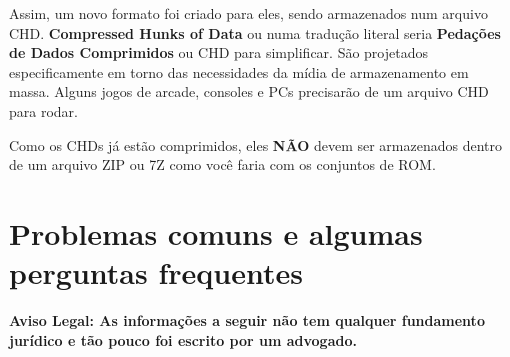 \documentclass[letterpaper,10pt,brazil]{sphinxmanual}
\begin{document}
Assim, um novo formato foi criado para eles, sendo armazenados num
arquivo CHD. \textbf{Compressed Hunks of Data} ou numa tradução literal seria
\textbf{Pedações de Dados Comprimidos} ou CHD para simplificar.
São projetados especificamente em torno das necessidades da mídia de
armazenamento em massa. Alguns jogos de arcade, consoles e PCs
precisarão de um arquivo CHD para rodar.

Como os CHDs já estão comprimidos, eles \textbf{NÃO} devem ser armazenados
dentro de um arquivo ZIP ou 7Z como você faria com os conjuntos de ROM.
\clearpage

\section{Problemas comuns e algumas perguntas frequentes}
\label{usingmame/commonissues:problemas-comuns-e-algumas-perguntas-frequentes}\label{usingmame/commonissues::doc}
\textbf{Aviso Legal: As informações a seguir não tem qualquer fundamento
jurídico e tão pouco foi escrito por um advogado.}
\end{document}
